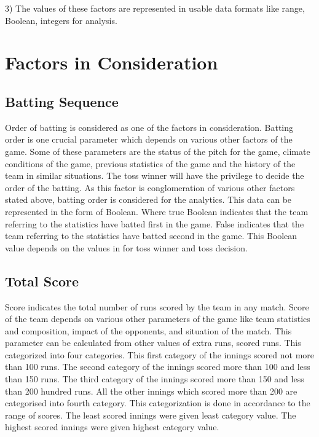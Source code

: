 \documentclass[sigconf]{acmart}
\begin{document}
3) The values of these factors are represented in usable data formats like range, Boolean, integers for analysis.


\section{Factors in Consideration}

\subsection{Batting Sequence}
Order of batting is considered as one of the factors in consideration. Batting order is one crucial parameter which depends on various other factors of the game. Some of these parameters are the status of the pitch for the game, climate conditions of the game, previous statistics of the game and the history of the team in similar situations. The toss winner will have the privilege to decide the order of the batting. As this factor is conglomeration of various other factors stated above, batting order is considered for the analytics. This data can be represented in the form of Boolean. Where true Boolean indicates that the team referring to the statistics have batted first in the game. False indicates that the team referring to the statistics have batted second in the game.  This Boolean value depends on the values in for toss winner and toss decision.
\subsection{Total Score}
Score indicates the total number of runs scored by the team in any match. Score of the team depends on various other parameters of the game like team statistics and composition, impact of the opponents, and situation of the match. This parameter can be calculated from other values of extra runs, scored runs. This categorized into four categories. This first category of the innings scored not more than 100 runs. The second category of the innings scored more than 100 and less than 150 runs. The third category of the innings scored more than 150 and less than 200 hundred runs. All the other innings which scored more than 200 are categorised into fourth category. This categorization is done in accordance to the range of scores. The least scored innings were given least category value. The highest scored innings were given highest category value.
\end{document}

